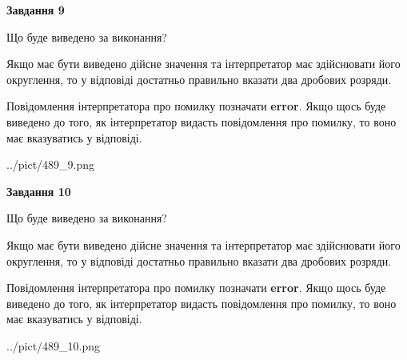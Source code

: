 \documentclass[12pt, ukrainian]{article}
\begin{document}
{\begin {Large}
{\begin {center}\textbf{Завдання 9}\end {center}}\par
Що буде виведено за виконання? \par

Якщо має бути виведено дійсне значення та інтерпретатор має здійснювати його округлення, 
то у відповіді достатньо правильно вказати два дробових розряди.

Повідомлення інтерпретатора про помилку позначати \textbf{error}.
Якщо щось буде виведено до того, як інтерпретатор видасть повідомлення про помилку, 
то воно має вказуватись у відповіді. \par

\begin{center}
	{../pict/489_9.png}
\end{center}
\newpage

{\begin {center}\textbf{Завдання 10}\end {center}}\par
Що буде виведено за виконання? \par

Якщо має бути виведено дійсне значення та інтерпретатор має здійснювати його округлення, 
то у відповіді достатньо правильно вказати два дробових розряди.

Повідомлення інтерпретатора про помилку позначати \textbf{error}.
Якщо щось буде виведено до того, як інтерпретатор видасть повідомлення про помилку, 
то воно має вказуватись у відповіді. \par

\begin{center}
	{../pict/489_10.png}
\end{center}
\newpage

\end {Large}}
\end{document}
